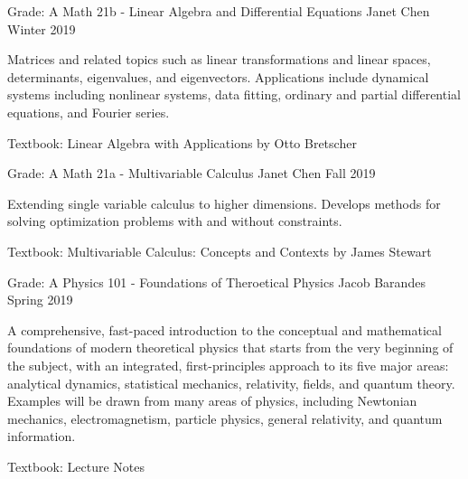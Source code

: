 
\begin{cventries}
  \cventry
  {Grade: A} %
  {Math 21b - Linear Algebra and Differential Equations} %
  {Janet Chen} %
  {Winter 2019} %
  {
    \begin{cvitems} %
    \item {Matrices and related topics such as linear transformations and linear spaces, determinants, eigenvalues, and eigenvectors. Applications include dynamical systems including nonlinear systems, data fitting, ordinary and partial differential equations, and Fourier series.}
    \item {Textbook: Linear Algebra with Applications by Otto Bretscher}
    \end{cvitems}
  }

  \cventry
  {Grade: A} %
  {Math 21a - Multivariable Calculus} %
  {Janet Chen} %
  {Fall 2019} %
  {
    \begin{cvitems} %
    \item {Extending single variable calculus to higher dimensions. Develops methods for solving optimization problems with and without constraints.}
    \item {Textbook: Multivariable Calculus: Concepts and Contexts by James Stewart}
    \end{cvitems}
  }


\end{cventries}


\begin{cventries}
  \cventry
  {Grade: A} %
  {Physics 101 - Foundations of Theroetical Physics} %
  {Jacob Barandes} %
  {Spring 2019} %
  {
    \begin{cvitems} %
    \item {A comprehensive, fast-paced introduction to the conceptual and mathematical foundations of modern theoretical physics that starts from the very beginning of the subject, with an integrated, first-principles approach to its five major areas: analytical dynamics, statistical mechanics, relativity, fields, and quantum theory. Examples will be drawn from many areas of physics, including Newtonian mechanics, electromagnetism, particle physics, general relativity, and quantum information.}
    \item {Textbook: Lecture Notes}
    \end{cvitems}
  }

\end{cventries}

